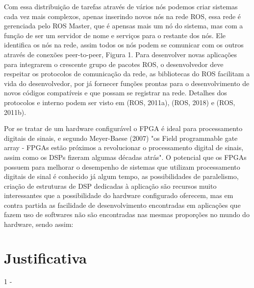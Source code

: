 Com essa distribuição de tarefas através de vários nós podemos criar sistemas cada
vez mais complexos, apenas inserindo novos nós na rede ROS, essa rede é gerenciada
pelo ROS Master, que é apensas mais um nó do sistema, mas com a função de ser um
servidor de nome e serviços para o restante dos nós. Ele identifica os nós na rede, assim
todos os nós podem se comunicar com os outros através de conexões peer-to-peer, Figura
1. Para desenvolver novas aplicações para integrarem o crescente grupo de pacotes ROS, o
desenvolvedor deve respeitar os protocolos de comunicação da rede, as bibliotecas do ROS
facilitam a vida do desenvolvedor, por já fornecer funções prontas para o desenvolvimento
de novos códigos compatíveis e que possam se registrar na rede. Detalhes dos protocolos e
interno podem ser visto em (ROS, 2011a), (ROS, 2018) e (ROS, 2011b).

Por se tratar de um hardware configurável o FPGA é ideal para processamento
digitais de sinais, e segundo Meyer-Baese (2007) "os Field programmable gate array -
FPGAs estão próximos a revolucionar o processamento digital de sinais, assim como os
DSPs fizeram algumas décadas atrás". O potencial que os FPGAs possuem para melhorar o 
desempenho de sistemas que utilizam processamento digitais de sinal é conhecido já algum
tempo, as possibilidades de paralelismo, criação de estruturas de DSP dedicadas à aplicação
são recursos muito interessantes que a possibilidade do hardware configurado oferecem,
mas em contra partida as facilidade de desenvolvimento encontradas em aplicações que
fazem uso de softwares não são encontradas nas mesmas proporções no mundo do hardware,
sendo assim:





\section{Justificativa}

1 - 



